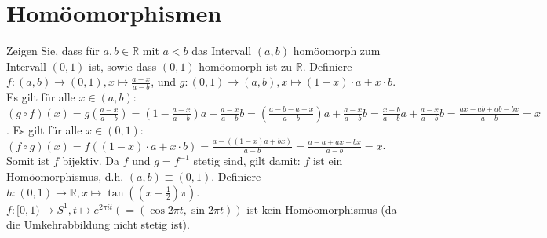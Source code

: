\documentclass[a4paper,11pt,notitlepage]{report}
\newcommand{\R}{{\ensuremath{\mathbb{R}}}}
\begin{document}
\section{Homöomorphismen}
Zeigen Sie, dass für $a,b \in \R$ mit $a < b$ das Intervall $(a,b)$ homöomorph zum Intervall $(0,1)$ ist, sowie dass $(0,1)$ homöomorph ist zu $\R$.
\newline
Definiere $f \colon (a,b) \rightarrow (0,1), x \mapsto \frac{a-x}{a-b}$, und $g \colon (0,1) \rightarrow (a,b), x \mapsto (1-x) \cdot a + x \cdot b$.
\newline
Es gilt für alle $x \in (a,b)$:
\newline
$(g \circ f)(x) = g \left(\frac{a-x}{a-b}\right) = \left(1- \frac{a-x}{a-b}\right)a + \frac{a-x}{a-b}b = \left(\frac{a-b-a+x}{a-b}\right)a+ \frac{a-x}{a-b}b = \frac{x-b}{a-b}a + \frac{a-x}{a-b}b = \frac{ax-ab+ab-bx}{a-b} = x$.
\newline
Es gilt für alle $x \in (0,1)$:
\newline
$(f \circ g)(x)=f\left((1-x) \cdot a + x \cdot b\right)=\frac{a-((1-x)a+bx)}{a-b}=\frac{a-a+ax-bx}{a-b}=x$. Somit ist $f$ bijektiv. 
Da $f$ und $g = f^{-1}$ stetig sind, gilt damit: $f$ ist ein Homöomorphismus, d.h. $(a,b) \equiv (0,1)$.
\newline
Definiere $h \colon (0,1) \rightarrow \R, x \mapsto \tan{\left((x-\frac{1}{2})\pi \right)}$.
\newline
\newline
$f \colon [0,1) \rightarrow S^1, t \mapsto e^{2\pi i t} \left(=(\cos{2 \pi t}, \sin{2 \pi t})\right)$ ist kein Homöomorphismus (da die Umkehrabbildung nicht stetig ist).

\begin{figure}[h]
\centering
{}
\end{figure}
\end{document}
